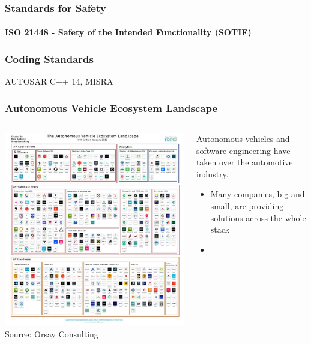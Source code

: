 \begin{frame}
\frametitle{Standards for Safety}
\framesubtitle{ISO 21448 - Safety of the Intended Functionality (SOTIF)}
\end{frame}


\begin{frame}
\frametitle{Coding Standards}
AUTOSAR C++ 14, MISRA
\end{frame}

\begin{frame}
\frametitle{Autonomous Vehicle Ecosystem Landscape}
\begin{columns}[]
    \begin{column}{0.4\textwidth}
        \centering
        \includegraphics[height=0.75\textheight]{images/av_ecosystem_landscape.png}\\
        \footnotesize{Source: Orsay Consulting\footnotemark[1]}        
    \end{column}
    \begin{column}{0.6\textwidth}
        Autonomous vehicles and software engineering have taken over the
        automotive industry.
        \begin{itemize}
            \item Many companies, big and small, are providing solutions across
                the whole stack
            \item 
        \end{itemize}
    \end{column}
\end{columns}
\end{frame}